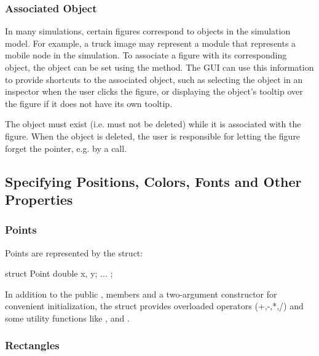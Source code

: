 \subsubsection{Associated Object}
\label{sec:graphics:figure-associated-object}

In many simulations, certain figures correspond to objects in the simulation
model. For example, a truck image may represent a module that represents a
mobile node in the simulation. To associate a figure with its corresponding
object, the object can be set using the  method.
The GUI can use this information to provide shortcuts to the associated object,
such as selecting the object in an inspector when the user clicks the figure, or
displaying the object's tooltip over the figure if it does not have its own
tooltip.

\begin{caution}
The object must exist (i.e. must not be deleted) while it is
associated with the figure. When the object is deleted, the user
is responsible for letting  the figure forget the pointer,
e.g. by a   call.
\end{caution}


\subsection{Specifying Positions, Colors, Fonts and Other Properties}
\label{sec:graphics:figure-positions-colors-fonts-etc}

\subsubsection{Points}
\label{sec:graphics:canvas-points}

Points are represented by the  struct:

\begin{cpp}
struct Point {
    double x, y;
    ...
};
\end{cpp}

In addition to the public ,  members and a two-argument
constructor for convenient initialization, the struct provides overloaded
operators (+,-,*,/) and some utility functions like ,
 and .

\subsubsection{Rectangles}
\label{sec:graphics:canvas-rectangles}

